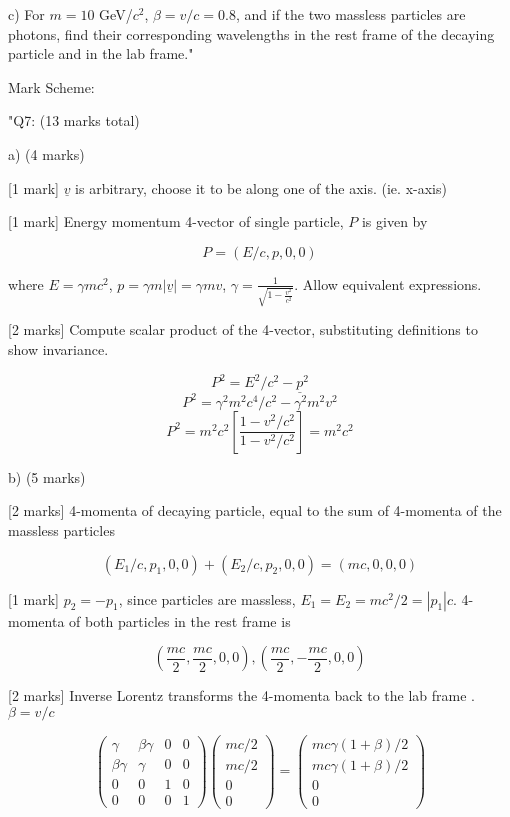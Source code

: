 c) For \( m = 10 \) GeV/\( c^{2} \), \( \beta = v/c = 0.8 \), and if the two massless particles are photons, find their corresponding wavelengths in the rest frame of the decaying particle and in the lab frame."

Mark Scheme:

"{Q7: (13 marks total)}

a) (4 marks)

[1 mark] \( \underline{v} \) is arbitrary, choose it to be along one of the axis. (ie. x-axis)

[1 mark] Energy momentum 4-vector of single particle, \( P \) is given by 

\[ P = ( E / c, p, 0, 0 ) \]

where \( E = \gamma m c^2 \), \( p = \gamma m | \underline{v} | = \gamma mv \), \( \gamma = \frac{1}{\sqrt{1-\frac{v^2}{c^2}}} \). Allow equivalent expressions.

[2 marks] Compute scalar product of the 4-vector, substituting definitions to show invariance.

\[ P^2 = E^2 / c^2 - \underline{p}^2 \]
\[ P^2 = \gamma^2 m^2 c^4 / c^2 - \gamma ^2 m^2 v^2 \]
\[ P^2 = m^2 c^2 \left [ \frac{1-v^2/c^2}{1-v^2/c^2} \right] = m^2c^2 \]

b) (5 marks)

[2 marks] 4-momenta of decaying particle, equal to the sum of 4-momenta of the massless particles 

\[ (E_1 / c, p_1, 0, 0) + (E_2 / c, p_2, 0, 0) = (mc, 0, 0, 0) \]

[1 mark] \( p_2 =  - p_1 \), since particles are massless, \( E_1 = E_2 = mc^2 / 2 = |p_1|c \). 4-momenta of both particles in the rest frame is

\[ \left( \frac{mc}{2}, \frac{mc}{2}, 0, 0 \right), \left( \frac{mc}{2}, -\frac{mc}{2}, 0, 0 \right) \]


[2 marks] Inverse Lorentz transforms the 4-momenta back to the lab frame . \( \beta = v / c \)

\[
\begin{pmatrix} \gamma & \beta \gamma & 0 & 0 \\ \beta \gamma & \gamma & 0 & 0 \\ 0 & 0 & 1 & 0 \\ 0 & 0 & 0 & 1 \end{pmatrix} \begin{pmatrix} mc/2\\ mc/2\\ 0\\ 0 \end{pmatrix} = \begin{pmatrix} mc \gamma (1+\beta) /2\\ mc \gamma (1+\beta) /2\\ 0\\ 0 \end{pmatrix}
\]

